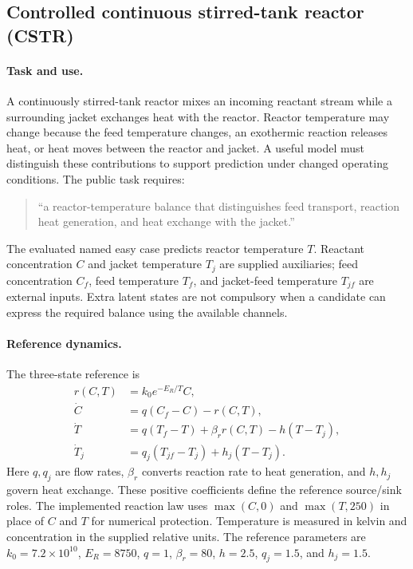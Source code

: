 \subsection{Controlled continuous stirred-tank reactor (CSTR)}
\label{app:benchmark_cstr}

\paragraph{Task and use.}
A continuously stirred-tank reactor mixes an incoming reactant stream while
a surrounding jacket exchanges heat with the reactor. Reactor temperature may
change because the feed temperature changes, an exothermic reaction releases
heat, or heat moves between the reactor and jacket. A useful model must
distinguish these contributions to support prediction under changed operating
conditions. The public task requires:
\begin{quote}
``a reactor-temperature balance that distinguishes feed transport, reaction
heat generation, and heat exchange with the jacket.''
\end{quote}
The evaluated named easy case predicts reactor temperature $T$. Reactant
concentration $C$ and jacket temperature $T_j$ are supplied auxiliaries;
feed concentration $C_f$, feed temperature $T_f$, and jacket-feed temperature
$T_{jf}$ are external inputs. Extra latent states are not compulsory when a
candidate can express the required balance using the available channels.

\paragraph{Reference dynamics.}
The three-state reference is
\begin{align}
r(C,T) &= k_0 e^{-E_R/T}C, \\
\dot C &= q(C_f-C)-r(C,T), \\
\dot T &= q(T_f-T)+\beta_r r(C,T)-h(T-T_j), \\
\dot T_j &= q_j(T_{jf}-T_j)+h_j(T-T_j).
\end{align}
Here $q,q_j$ are flow rates, $\beta_r$ converts reaction rate to heat generation,
and $h,h_j$ govern heat exchange. These positive coefficients define the
reference source/sink roles. The implemented reaction law uses
$\max(C,0)$ and $\max(T,250)$ in place of $C$ and $T$ for numerical protection.
Temperature is measured in kelvin and concentration in the supplied relative
units. The reference parameters are
$k_0=7.2\times10^{10}$, $E_R=8750$, $q=1$, $\beta_r=80$,
$h=2.5$, $q_j=1.5$, and $h_j=1.5$.

